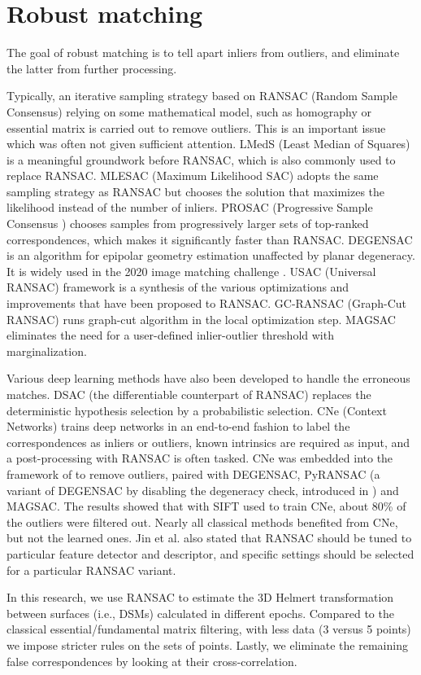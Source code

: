 \section{Robust matching}
The goal of robust matching is to tell apart inliers from outliers, and eliminate the latter from further processing.
\par
Typically, an iterative sampling strategy based on RANSAC (Random Sample Consensus) \cite{fischler1981random} relying on some mathematical model, such as homography \cite{sonka2014image} or essential matrix \cite{sonka2014image} is carried out to remove outliers. 
This is an important issue which was often not given sufficient attention.
LMedS (Least Median of Squares) \cite{leroy1987robust} is a meaningful groundwork before RANSAC, which is also commonly used to replace RANSAC.
MLESAC (Maximum Likelihood SAC)  \cite{torr2000mlesac} adopts the same sampling strategy as RANSAC but chooses the solution that maximizes the likelihood instead of the number of inliers. PROSAC (Progressive Sample Consensus ) \cite{chum2005matching} chooses samples from progressively larger sets of top-ranked correspondences, which makes it significantly faster than RANSAC. DEGENSAC \cite{chum2005two} is an algorithm for epipolar geometry estimation unaffected by planar degeneracy. It is widely used in the 2020 image matching challenge \cite{imagematchingchallenge2020}.
USAC (Universal RANSAC) \cite{raguram2012usac} framework is a synthesis of the various optimizations and improvements that have been proposed to RANSAC.
GC-RANSAC (Graph-Cut RANSAC) \cite{barath2018graph} runs graph-cut algorithm in the local optimization step.
MAGSAC \cite{barath2019magsac} eliminates the need for a user-defined inlier-outlier threshold with marginalization.
\par
Various deep learning methods have also been developed to handle the erroneous matches.
DSAC (the differentiable counterpart of RANSAC) \cite{brachmann2017dsac} replaces the deterministic hypothesis selection by a probabilistic selection.
CNe (Context Networks) \cite{moo2018learning} trains deep networks in an end-to-end fashion to label the correspondences as inliers or outliers, known intrinsics are required as input, and a post-processing with RANSAC is often tasked. CNe was embedded into the framework of \cite{jin2020image} to remove outliers, paired with DEGENSAC, PyRANSAC (a variant of DEGENSAC by disabling the degeneracy check, introduced in \cite{jin2020image}) and MAGSAC. The results showed that with SIFT used to train CNe, about 80\% of the outliers were filtered out. Nearly all classical methods benefited from CNe, but not the learned ones. Jin et al. \cite{jin2020image} also stated that RANSAC should be tuned to particular feature detector and descriptor, and specific settings should be selected for a particular RANSAC variant.
\par
In this research, we use RANSAC to estimate the 3D Helmert transformation between surfaces (i.e., DSMs) calculated in different epochs. Compared to the classical essential/fundamental matrix filtering, with less data (3 versus 5 points) we impose stricter rules on the sets of points. Lastly, we eliminate the remaining false correspondences by looking at their cross-correlation.

